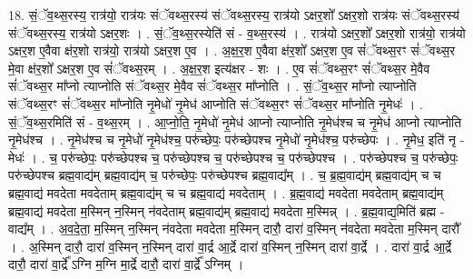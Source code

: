 \documentclass[17pt]{extarticle}
\begin{document}
18. सं॒ॅव॒थ्स॒रस्य॒ रात्र॑यो॒ रात्र॑यः संॅवथ्स॒रस्य॑ संॅवथ्स॒रस्य॒ रात्र॑यो ऽक्षर॒शो᳚ ऽक्षर॒शो रात्र॑यः संॅवथ्स॒रस्य॑ संॅवथ्स॒रस्य॒ रात्र॑यो ऽक्षर॒शः । . सं॒ॅव॒थ्स॒रस्येति॑ सं - व॒थ्स॒रस्य॑ । . रात्र॑यो ऽक्षर॒शो᳚ ऽक्षर॒शो रात्र॑यो॒ रात्र॑यो ऽक्षर॒श ए॒वैवा क्ष॑र॒शो रात्र॑यो॒ रात्र॑यो ऽक्षर॒श ए॒व । . अ॒क्ष॒र॒श ए॒वैवा क्ष॑र॒शो᳚ ऽक्षर॒श ए॒व सं॑ॅवथ्स॒रꣳ सं॑ॅवथ्स॒र मे॒वा क्ष॑र॒शो᳚ ऽक्षर॒श ए॒व सं॑ॅवथ्स॒रम् । . अ॒क्ष॒र॒श इत्य॑क्षर - शः । . ए॒व सं॑ॅवथ्स॒रꣳ सं॑ॅवथ्स॒र मे॒वैव सं॑ॅवथ्स॒र मा᳚प्नो त्याप्नोति संॅवथ्स॒र मे॒वैव सं॑ॅवथ्स॒र मा᳚प्नोति । . सं॒ॅव॒थ्स॒र मा᳚प्नो त्याप्नोति संॅवथ्स॒रꣳ सं॑ॅवथ्स॒र मा᳚प्नोति नृ॒मेधो॑ नृ॒मेध॑ आप्नोति संॅवथ्स॒रꣳ सं॑ॅवथ्स॒र मा᳚प्नोति नृ॒मेधः॑ । . सं॒ॅव॒थ्स॒रमिति॑ सं - व॒थ्स॒रम् । . आ॒प्नो॒ति॒ नृ॒मेधो॑ नृ॒मेध॑ आप्नो त्याप्नोति नृ॒मेध॑श्च च नृ॒मेध॑ आप्नो त्याप्नोति नृ॒मेध॑श्च । . नृ॒मेध॑श्च च नृ॒मेधो॑ नृ॒मेध॑श्च॒ परु॑च्छेपः॒ परु॑च्छेपश्च नृ॒मेधो॑ नृ॒मेध॑श्च॒ परु॑च्छेपः । . नृ॒मेध॒ इति॑ नृ - मेधः॑ । . च॒ परु॑च्छेपः॒ परु॑च्छेपश्च च॒ परु॑च्छेपश्च च॒ परु॑च्छेपश्च च॒ परु॑च्छेपश्च । . परु॑च्छेपश्च च॒ परु॑च्छेपः॒ परु॑च्छेपश्च ब्रह्म॒वाद्य॑म् ब्रह्म॒वाद्य॑म् च॒ परु॑च्छेपः॒ परु॑च्छेपश्च ब्रह्म॒वाद्य᳚म् । . च॒ ब्र॒ह्म॒वाद्य॑म् ब्रह्म॒वाद्य॑म् च च ब्रह्म॒वाद्य॑ मवदेता मवदेताम् ब्रह्म॒वाद्य॑म् च च ब्रह्म॒वाद्य॑ मवदेताम् । . ब्र॒ह्म॒वाद्य॑ मवदेता मवदेताम् ब्रह्म॒वाद्य॑म् ब्रह्म॒वाद्य॑ मवदेता म॒स्मिन् न॒स्मिन् न॑वदेताम् ब्रह्म॒वाद्य॑म् ब्रह्म॒वाद्य॑ मवदेता म॒स्मिन्न् । . ब्र॒ह्म॒वाद्य॒मिति॑ ब्रह्म - वाद्य᳚म् । . अ॒व॒दे॒ता॒ म॒स्मिन् न॒स्मिन् न॑वदेता मवदेता म॒स्मिन् दारौ॒ दारा॑ व॒स्मिन् न॑वदेता मवदेता म॒स्मिन् दारौ᳚ । . अ॒स्मिन् दारौ॒ दारा॑ व॒स्मिन् न॒स्मिन् दारा॑ वा॒र्द्र आ॒र्द्रे दारा॑ व॒स्मिन् न॒स्मिन् दारा॑ वा॒र्द्रे । . दारा॑ वा॒र्द्र आ॒र्द्रे दारौ॒ दारा॑ वा॒र्द्रे᳚ ऽग्नि म॒ग्नि मा॒र्द्रे दारौ॒ दारा॑ वा॒र्द्रे᳚ ऽग्निम् । \newline
\end{document}
